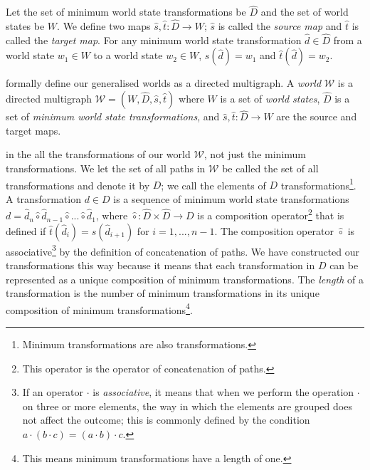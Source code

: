 Let the set of minimum world state transformations be $\hat{D}$ and the set of world states be $W$.
We define two maps $\hat{s},\hat{t}: \hat{D} \to W$; $\hat{s}$ is called the \emph{source map} and $\hat{t}$ is called the \emph{target map}.
For any minimum world state transformation $\hat{d} \in \hat{D}$ from a world state $w_{1} \in W$ to a world state $w_{2} \in W$, $\hat{s}(\hat{d}) = w_{1}$ and $\hat{t}(\hat{d}) = w_{2}$.

 formally define our generalised worlds as a directed multigraph.
A \emph{world} $\mathscr{W}$ is a directed multigraph $\mathscr{W} = (W, \hat{D}, \hat{s}, \hat{t})$ where $W$ is a set of \emph{world states}, $\hat{D}$ is a set of \emph{minimum world state transformations}, and $\hat{s},\hat{t}: \hat{D} \to W$ are the source and target maps.

 in the all the transformations of our world $\mathscr{W}$, not just the minimum transformations.
We let the set of all paths in $\mathscr{W}$ be called the set of all transformations and denote it by $D$; we call the elements of $D$ transformations\footnote{Minimum transformations are also transformations.}.
A transformation $d \in D$ is a sequence of minimum world state transformations $d = \hat{d}_{n} \hat{\circ} \hat{d}_{n-1} \hat{\circ} ... \hat{\circ} \hat{d}_{1}$, where $\hat{\circ}: \hat{D} \times \hat{D} \to D$ is a composition operator\footnote{This operator is the operator of concatenation of paths.} that is defined if $\hat{t}(\hat{d}_{i}) = \hat{s}(\hat{d}_{i+1})$ for $i = 1, ..., n-1$.
The composition operator $\hat{\circ}$ is associative\footnote{If an operator $\cdot$ is \emph{associative}, it means that when we perform the operation $\cdot$ on three or more elements, the way in which the elements are grouped does not affect the outcome; this is commonly defined by the condition $a \cdot (b \cdot c) = (a \cdot b) \cdot c$.} by the definition of concatenation of paths.
We have constructed our transformations this way because it means that each transformation in $D$ can be represented as a unique composition of minimum transformations. 
The \emph{length} of a transformation is the number of minimum transformations in its unique composition of minimum transformations\footnote{This means minimum transformations have a length of one.}.

